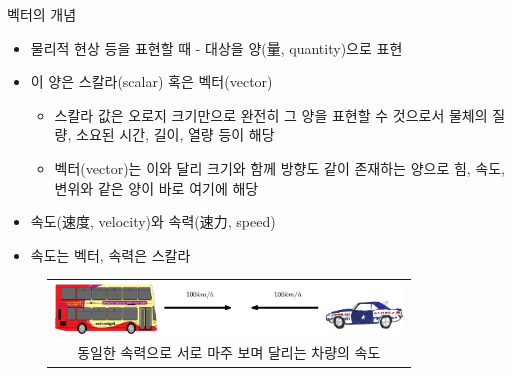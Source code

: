 \begin{frame}{벡터의 개념}

\begin{itemize}
\item 물리적 현상 등을 표현할 때 - 대상을 양(量, quantity)으로 표현 
\item 이 양은 스칼라(scalar) 혹은 벡터(vector)
	\begin{itemize}
	\item 스칼라 값은 오로지 크기만으로 완전히 그 양을 표현할 수 것으로서 물체의 질량, 소요된 시간, 길이, 열량 등이 해당
	\item 벡터(vector)는 이와 달리 크기와 함께 방향도 같이 존재하는 양으로 힘, 속도, 변위와 같은 양이 바로 여기에 해당
	\end{itemize}
\end{itemize}

\begin{itemize}
\item 속도(速度, velocity)와 속력(速力, speed)
\item 속도는 벡터, 속력은 스칼라
\end{itemize}

\begin{figure}
\begin{tabular}{c}
\includegraphics[width=9.25cm]{./Math_vector/movingVehicles.eps} \\
{\tiny 동일한 속력으로 서로 마주 보며 달리는 차량의 속도 }
\end{tabular}
\end{figure}
\end{frame}

